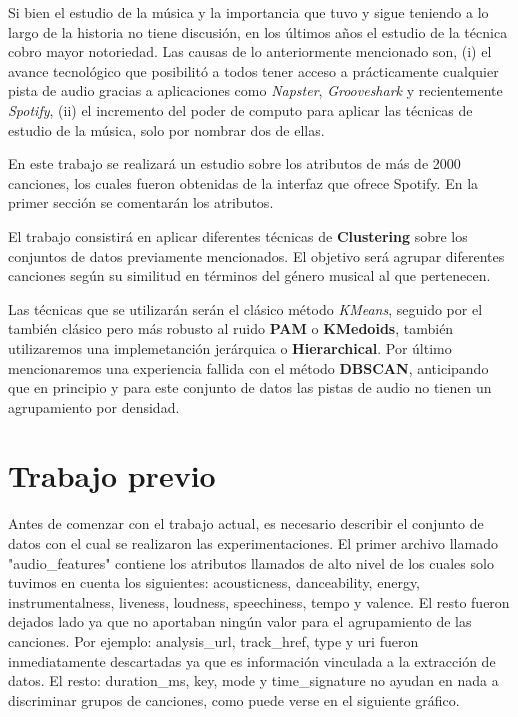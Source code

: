 \documentclass{icisfinal}
\begin{document}
Si bien el estudio de la música y la importancia que tuvo y sigue teniendo a lo largo de la historia no tiene discusión, en los últimos años el estudio de la técnica cobro mayor notoriedad. Las causas de lo anteriormente mencionado son, (i) el avance tecnológico que posibilitó a todos tener acceso a prácticamente cualquier pista de audio gracias a aplicaciones como \textit{Napster}, \textit{Grooveshark} y recientemente \textit{Spotify}, (ii) el incremento del poder de computo para aplicar las técnicas de estudio de la música, solo por nombrar dos de ellas.

En este trabajo se realizará un estudio sobre los atributos de más de 2000 canciones, los cuales fueron obtenidas de la interfaz que ofrece Spotify. En la primer sección se comentarán los atributos.

El trabajo consistirá en aplicar diferentes técnicas de \textbf{Clustering} sobre los conjuntos de datos previamente mencionados. El objetivo será agrupar diferentes canciones según su similitud en términos del género musical al que pertenecen.

Las técnicas que se utilizarán serán el clásico método \textit{KMeans}, seguido por el también clásico pero más robusto al ruido \textbf{PAM} o \textbf{KMedoids}, también utilizaremos una implemetanción jerárquica o \textbf{Hierarchical}. Por último mencionaremos una experiencia fallida con el método \textbf{DBSCAN}, anticipando que en principio y para este conjunto de datos las pistas de audio no tienen un agrupamiento por densidad.

\section{Trabajo previo}
Antes de comenzar con el trabajo actual, es necesario describir el conjunto de datos con el cual se realizaron las experimentaciones. El primer archivo llamado "audio\_features" contiene los atributos llamados de alto nivel de los cuales solo tuvimos en cuenta los siguientes: acousticness, danceability, energy, instrumentalness, liveness, loudness, speechiness, tempo y valence. El resto fueron dejados lado ya que no aportaban ningún valor para el agrupamiento de las canciones. Por ejemplo: analysis\_url, track\_href, type y uri fueron inmediatamente descartadas ya que es información vinculada a la extracción de datos. El resto: duration\_ms, key, mode y time\_signature no ayudan en nada a discriminar grupos de canciones, como puede verse en el siguiente gráfico.
\end{document}
